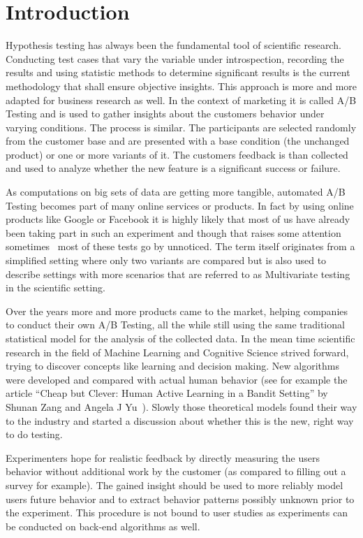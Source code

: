 \documentclass[main.tex]{subfiles}
\begin{document}
\chapter{Introduction}
Hypothesis testing has always been the fundamental tool of scientific research. Conducting test cases that vary the variable under introspection, recording the results and using statistic methods to determine significant results is the current methodology that shall ensure objective insights. This approach is more and more adapted for business research as well. In the context of marketing it is called A/B Testing and is used to gather insights about the customers behavior under varying conditions. The process is similar. The participants are selected randomly from the customer base and are presented with a base condition (the unchanged product) or one or more variants of it. The customers feedback is than collected and used to analyze whether the new feature is a significant success or failure.

As computations on big sets of data are getting more tangible, automated A/B Testing becomes part of many online services or products. In fact by using online products like Google or Facebook it is highly likely that most of us have already been taking part in such an experiment and though that raises some attention sometimes~\cite{arthur2014facebook} most of these tests go by unnoticed. The term itself originates from a simplified setting where only two variants are compared but is also used to describe settings with more scenarios that are referred to as Multivariate testing in the scientific setting. 

Over the years more and more products came to the market, helping companies to conduct their own A/B Testing, all the while still using the same traditional statistical model for the analysis of the collected data. In the mean time scientific research in the field of Machine Learning and Cognitive Science strived forward, trying to discover concepts like learning and decision making. New algorithms were developed and compared with actual human behavior (see for example the article ``Cheap but Clever: Human Active Learning in a Bandit Setting'' by Shunan Zang and Angela J Yu~\cite{zhang2013cheap}). Slowly those theoretical models found their way to the industry and started a discussion about whether this is the new, right way to do testing.

Experimenters hope for realistic feedback by directly measuring the users behavior without additional work by the customer (as compared to filling out a survey for example). The gained insight should be used to more reliably model users future behavior and to extract behavior patterns possibly unknown prior to the experiment. This procedure is not bound to user studies as experiments can be conducted on back-end algorithms as well.
\end{document}
